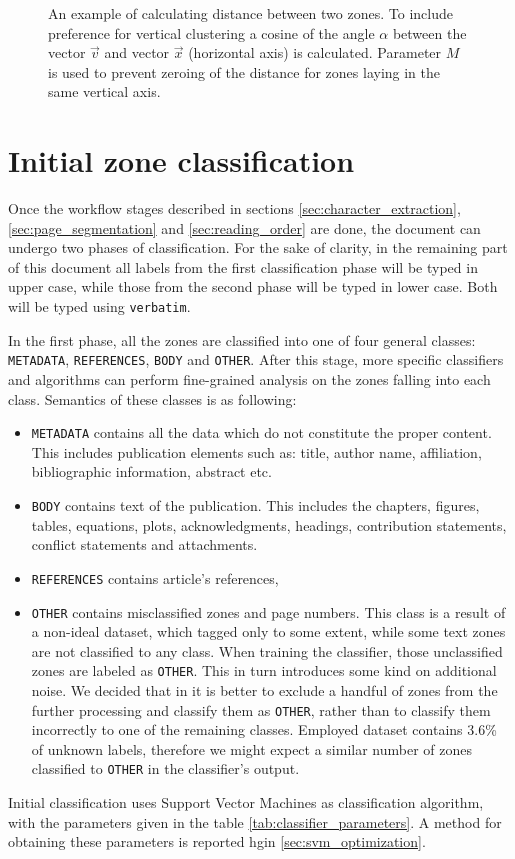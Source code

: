 \begin{figure}[ht!]
  \centering
  
  \caption{An example of calculating distance between two zones. To include preference for vertical clustering a cosine of the angle $\alpha$ between the vector $\vec{v}$ and vector $\vec{x}$ (horizontal axis) is calculated. Parameter $M$ is used to prevent zeroing of the distance for zones laying in the same vertical axis.}
  \label{fig:angle_alpha}
\end{figure}

\section{Initial zone classification}
Once the workflow stages described in sections \ref{sec:character_extraction}, \ref{sec:page_segmentation} and \ref{sec:reading_order} are done, the document can undergo two phases of classification. For the sake of clarity, in the remaining part of this document all labels from the first classification phase will be typed in upper case, while those from the second phase will be typed in lower case. Both will be typed using \verb+verbatim+.

In the first phase, all the zones are classified into one of four general classes: \verb+METADATA+, \verb+REFERENCES+, \verb+BODY+ and \verb+OTHER+. After this stage, more specific classifiers and algorithms can perform fine-grained analysis on the zones falling into each class. Semantics of these classes is as following:

\begin{itemize}
\item \verb+METADATA+ contains all the data which do not constitute the proper content. This includes publication elements such as: title, author name, affiliation, bibliographic information, abstract etc.
\item \verb+BODY+ contains text of the publication. This includes the chapters, figures, tables, equations, plots, acknowledgments, headings, contribution statements, conflict statements and attachments.
\item \verb+REFERENCES+ contains article's references,
\item \verb+OTHER+ contains misclassified zones and page numbers. This class is a result of a non-ideal dataset, which tagged only to some extent, while some text zones are not classified to any class. When training the classifier, those unclassified zones are labeled as \verb+OTHER+. This in turn introduces some kind on additional noise. We decided that in it is better to exclude a handful of zones from the further processing and classify them as \verb+OTHER+, rather than to classify them incorrectly to one of the remaining classes. Employed dataset contains 3.6\% of unknown labels, therefore we might expect a similar number of zones classified to \verb+OTHER+ in the classifier's output.
\end{itemize}
\quad
Initial classification uses Support Vector Machines as classification algorithm, with the parameters given in the table \ref{tab:classifier_parameters}. A method for obtaining these parameters is reported hgin \ref{sec:svm_optimization}.

